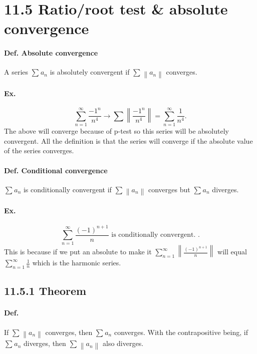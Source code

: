 \section*{11.5 Ratio/root test \& absolute convergence}%
\label{sec:11.5 Ratio/root test}
\paragraph{Def. Absolute convergence}
A series $ \sum_{  } ^{  } a_n $ is absolutely convergent if $ \sum_{  } ^{  } \left\| a_n \right\| $ converges.
\paragraph{Ex.}
\[
\sum_{ n=1 } ^{ \infty } \frac{ -1^{ n } }{ n^{ 4 } } \to \sum_{  } ^{  } \left\| \frac{ -1^{ n } }{ n^{ 4 } } \right\| = \sum_{ n=1 } ^{ \infty } \frac{ 1 }{ n^{ 4 } } 
.\] 
The above will converge because of p-test so this series will be absolutely convergent. All the definition is that the series will converge if the absolute value of the series converges. \\

\paragraph{Def. Conditional convergence}
$ \sum_{  } ^{  } a_n $ is conditionally convergent if $ \sum_{  } ^{  } \left\| a_n \right\| $ converges but $ \sum_{ } ^{  } a_n $ diverges. 

\paragraph{Ex.}
\[
	\sum_{ n=1 } ^{ \infty } \frac{ \left( -1 \right) ^{ n+1 } }{ n } \text{ is conditionally convergent.  }
.\] 
This is because if we put an absolute to make it $ \sum_{ n=1 } ^{ \infty } \left\| \frac{ \left( -1 \right) ^{ n+1 } }{ n } \right\| $ will equal $ \sum_{ n=1 } ^{ \infty } \frac{ 1 }{ n }  $ which is the harmonic series.

\subsection*{11.5.1 Theorem}%
\label{sub:11.5.1 Theorem}
\paragraph{Def.}
If $ \sum_{  } ^{  } \left\| a_n \right\| $ converges, then $ \sum_{  } ^{  } a_n $ converges. With the contrapositive being, if $ \sum_{  } ^{  } a_n $ diverges, then $ \sum_{  } ^{  } \left\| a_n \right\| $ also diverges. 
